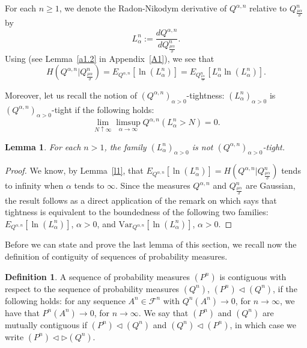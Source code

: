 \documentclass[reqno,a4paper]{amsart}
\theoremstyle{plain}
\theoremstyle{definition}
\newtheorem{definition}{Definition}
\theoremstyle{plain}
\newtheorem{lemma}{Lemma}
\theoremstyle{plain}
\theoremstyle{plain}
\begin{document}
For each $n\geq 1$, we denote the Radon-Nikodym derivative of $Q^{\alpha,n}$ relative to $Q_{\frac{\mu\alpha}{\sigma}}^n$  by $$L_\alpha^n:=\frac{dQ^{\alpha,n}}{dQ_{\frac{\mu\alpha}{\sigma}}^n}.$$
Using \cite[Lemma 6.1]{Hihi} (see Lemma~\ref{a1.2} in Appendix~\ref{A1}), we see that
$$H\left(Q^{\alpha,n}|Q_{\frac{\mu\alpha}{\sigma}}^n\right)=E_{Q^{\alpha,n}}[\ln(L_\alpha^n)]=E_{Q_{\frac{\mu\alpha}{\sigma}}^n}[L_\alpha^n\ln(L_\alpha^n)].$$

Moreover, let us recall the notion of $(Q^{\alpha,n})_{\alpha>0}$-tightness: $(L_\alpha^n)_{\alpha>0}$ is $(Q^{\alpha,n})_{\alpha>0}$-tight if the following holds:
$$\lim_{N\uparrow\infty}\limsup_{\alpha\to\infty}Q^{\alpha,n}(L_\alpha^n>N)=0.$$

\begin{lemma}\label{l2}
For each $n>1$, the family $(L_\alpha^n)_{\alpha>0}$ is not $(Q^{\alpha,n})_{\alpha>0}$-tight.
\end{lemma}
\begin{proof}
We know, by Lemma~\ref{l1}, that $E_{Q^{\alpha,n}}[\ln(L_\alpha^n)]=H\left(Q^{\alpha,n}|Q_{\frac{\mu\alpha}{\sigma}}^n\right)$ tends to infinity when $\alpha$ tends to $\infty$. Since the measures $Q^{\alpha,n}$ and $Q_{\frac{\mu\alpha}{\sigma}}^n$ are Gaussian, the result follows as a direct application of the remark on \cite[p. 457]{Eag81} which says that tightness is equivalent to the boundedness of the following two families: $E_{Q^{\alpha,n}}[\ln(L_\alpha^n)]$, $\alpha>0$, and $\text{Var}_{Q^{\alpha,n}}[\ln(L_\alpha^n)]$, $\alpha>0$.
\end{proof}

Before we can state and prove the last lemma of this section, we recall now the definition of contiguity of sequences of probability measures.
\begin{definition}\label{con}
A sequence of probability measures ${(P^n)}$ is contiguous with respect to the sequence of probability measures ${(Q^n)}$,
${(P^n)}{\triangleleft}{(Q^n)}$, if the following holds:
for any sequence $A^n\in\mathcal{F}^n$ with $Q^n(A^n)\to0$, for $n\to\infty$, we have that $P^n(A^n)\to0$, for $n\to\infty$. We say that ${(P^n)}$ and ${(Q^n)}$ are mutually contiguous if ${(P^n)}{\triangleleft}{(Q^n)}$ and ${(Q^n)}{\triangleleft}{(P^n)}$, in which case we write ${(P^n)}\triangleleft\triangleright {(Q^n)}$.
\end{definition}
\end{document}
